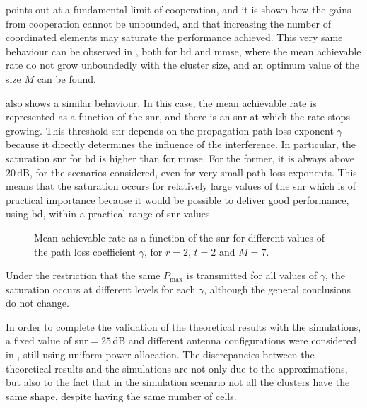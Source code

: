 \cite{lozano13} points out at a fundamental limit of cooperation, and it is
shown how the gains from cooperation cannot be unbounded, and that increasing
the number of coordinated elements may saturate the performance achieved. This
very same behaviour can be observed in , both for
\gls{bd} and \gls{mmse}, where the mean achievable rate do not grow unboundedly
with the cluster size, and an optimum value of the size $M$ can be found.

 also shows a similar behaviour. In this case, the
mean achievable rate is represented as a function of the \gls{snr}, and there is
an \gls{snr} at which the rate stops growing. This threshold \gls{snr} depends
on the propagation path loss exponent $\gamma$ because it directly determines
the influence of the interference. In particular, the saturation \gls{snr} for
\gls{bd} is higher than for \gls{mmse}. For the former, it is always above
20\,dB, for the scenarios considered, even for very small path loss exponents.
This means that the saturation occurs for relatively large values of the
\gls{snr} which is of practical importance because it would be possible to
deliver good performance, using \gls{bd}, within a practical range of \gls{snr}
values.

\begin{figure}[t]
\begin{center}
    
    \restoregeometry
\end{center}
\caption{Mean achievable rate as a function of the \gls{snr} for different
values of the path loss coefficient $\gamma$, for $r=2$, $t = 2$ and $M = 7$.}
\label{fig:rate_vs_snr_gamma}
\end{figure}

Under the restriction that the same $P_{\max}$ is transmitted for all values of
$\gamma$, the saturation occurs at different levels for each $\gamma$, although
the general conclusions do not change.

In order to complete the validation of the theoretical results with the
simulations, a fixed value of \gls{snr}$=25$\,dB and different antenna
configurations were considered in , still using
uniform power allocation. The discrepancies between the theoretical results and
the simulations are not only due to the approximations, but also to the fact
that in the simulation scenario not all the clusters have the same shape,
despite having the same number of cells.


